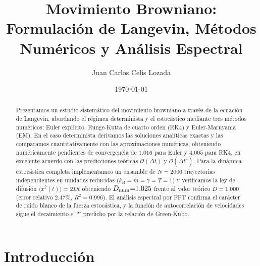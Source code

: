 \documentclass[aps,prl,twocolumn,showpacs,superscriptaddress,longbibliography]{revtex4-2}
\newcommand{\kB}{k_{\mathrm{B}}}
\newcommand{\MSD}{\langle x^2(t) \rangle}
\newcommand{\dt}{\Delta t}
\begin{document}
	
	\title{Movimiento Browniano: Formulación de Langevin,
		Métodos Numéricos y Análisis Espectral}
	
	\author{Juan Carlos Celis Lozada}
	
	\date{\today}
	
	\begin{abstract}
		Presentamos un estudio sistemático del movimiento browniano a través de
		la ecuación de Langevin, abordando el régimen determinista y el
		estocástico mediante tres métodos numéricos: Euler explícito,
		Runge-Kutta de cuarto orden (RK4) y Euler-Maruyama (EM).
		En el caso determinista derivamos las soluciones analíticas exactas y
		las comparamos cuantitativamente con las aproximaciones numéricas,
		obteniendo numéricamente pendientes de convergencia de $1.016$ para
		Euler y $4.005$ para RK4, en excelente acuerdo con las predicciones
		teóricas $\mathcal{O}(\dt)$ y $\mathcal{O}(\dt^{4})$.
		Para la dinámica estocástica completa implementamos un ensamble de
		$N{=}2000$ trayectorias independientes en unidades reducidas
		($\kB{=}m{=}\gamma{=}T{=}1$) y verificamos la ley de difusión
		$\MSD{=}2Dt$ obteniendo $D_{\rm num}{=}1.025$ frente al valor teórico
		$D{=}1.000$ (error relativo $2.47\%$, $R^{2}{=}0.996$).
		El análisis espectral por FFT confirma el carácter de ruido blanco de
		la fuerza estocástica, y la función de autocorrelación de velocidades
		sigue el decaimiento $e^{-\beta\tau}$ predicho por la relación de
		Green-Kubo.
	\end{abstract}
	
	
	\maketitle
	
	\section{Introducción}
	\label{sec:intro}
	
\end{document}
